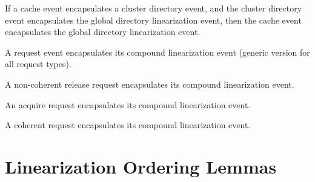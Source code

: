 \begin{lemma}
  \label{lem:e_encap_dir_lin_encap_global_dir_lin}
  \leanok
  If a cache event encapsulates a cluster directory event, and the cluster
  directory event encapsulates the global directory linearization event,
  then the cache event encapsulates the global directory linearization event.
\end{lemma}

\begin{lemma}
  \label{lem:request_encapsulates_cmp_lin}
  \leanok
  A request event encapsulates its compound linearization event
  (generic version for all request types).
\end{lemma}

\begin{lemma}
  \label{lem:nc_release_encapsulates_cmp_lin}
  \leanok
  A non-coherent release request encapsulates its compound linearization event.
\end{lemma}

\begin{lemma}
  \label{lem:acquire_encapsulates_cmp_lin}
  \leanok
  An acquire request encapsulates its compound linearization event.
\end{lemma}

\begin{lemma}
  \label{lem:coherent_encapsulates_cmp_lin}
  \leanok
  A coherent request encapsulates its compound linearization event.
\end{lemma}

\section{Linearization Ordering Lemmas}
\label{sec:cache-request-linearization-ordering}

